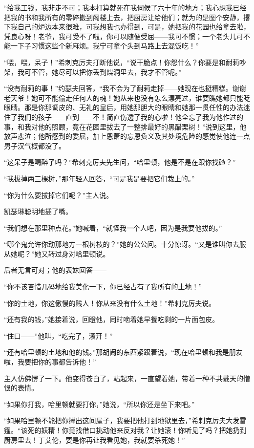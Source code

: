 \par “给我工钱，我非走不可；我本打算就死在我伺候了六十年的地方；我心想我已经把我的书和我所有的零碎搬到阁楼上去，把厨房让给他们；就为的是图个安静，撂下我自己的炉边本来很难，可我想我也办得到，可是，她把我的花园也给拿去啦，凭良心呀！老爷，我可受不了啦，你可以随便受屈——我可不惯；一个老头儿可不能一下子习惯这些个新麻烦。我宁可拿个头到马路上去混饭吃！”
\par “喂，喂，呆子！”希刺克厉夫打断他说，“说干脆点！你怨什么？你要是和耐莉吵架，我可不管，她尽可以把你丢到煤洞里去，我才不管呢。”
\par “没有耐莉的事！”约瑟夫回答，“我不会为了耐莉走掉——她现在也挺糟糕。谢谢老天爷！她可不能偷走任何人的魂！她从来也没有怎么漂亮过，谁要瞧她都只能眨眼睛。那是你那调皮的、无礼的皇后，用她那胆大的眼睛和她那一贯任性的办法迷住了我们的孩子——直到——不！简直伤透了我的心啦！他全忘了我为他作过的事，和我对他的照顾，竟在花园里拔去了一整排最好的黑醋栗树！”说到这里，他放声悲泣；他所感到的委屈，加上恩萧的忘恩负义及其处境危险的感觉使他连一点男子汉气概都没了。
\par “这呆子是喝醉了吗？”希刺克厉夫先生问，“哈里顿，他是不是在跟你找碴？”
\par “我拔掉两三棵树，”那年轻人回答，“可是我是要把它们栽上的。”
\par “你为什么要拔掉它们呢？”主人说。
\par 凯瑟琳聪明地插了嘴。
\par “我们想在那里种点花。”她喊着，“就怪我一个人吧，因为是我要他拔的。”
\par “哪个鬼允许你动那地方一根树枝的？”她的公公问。十分惊讶。“又是谁叫你去服从她呢？”她又转过身对哈里顿说。
\par 后者无言可对；他的表妹回答——
\par “你不该吝惜几码地给我美化一下，你已经占有了我所有的土地！”
\par “你的土地，你这傲慢的贱人！你从来没有什么土地！”希刺克厉夫说。
\par “还有我的钱，”她接着说，回瞪他，同时啮着她早餐吃剩的一片面包皮。
\par “住口——”他叫，“吃完了，滚开！”
\par “还有哈里顿的土地和他的钱。”那胡闹的东西紧跟着说，“现在哈里顿和我是朋友啦，我要把你的事都告诉他！”
\par 主人仿佛愣了一下。他变得苍白了，站起来，一直望着她，带着一种不共戴天的憎恨的表情。
\par “如果你打我，哈里顿就要打你，”她说，“所以你还是坐下来吧。”
\par “如果哈里顿不能把你撵出这间屋子，我要把他打到地狱里去，”希刺克厉夫大发雷霆。“该死的妖精！你竟找借口挑动他来反对我？让她滚！你听见了吗？把她扔到厨房里去！丁艾伦，要是你再让我看见她，我就要杀死她！”
